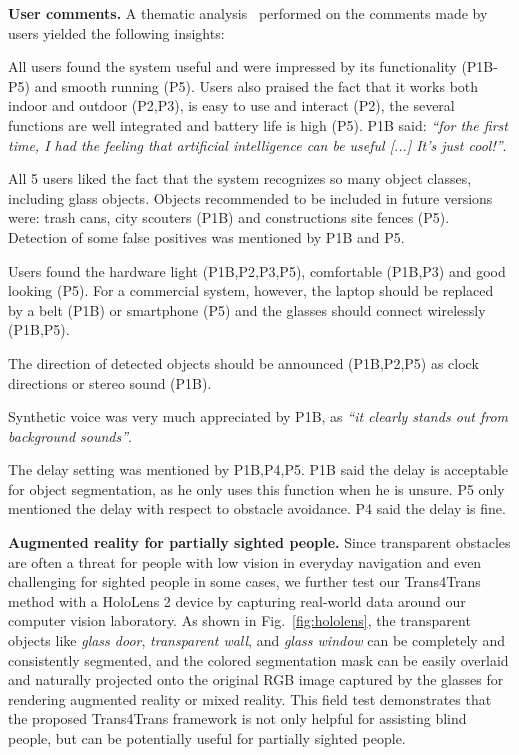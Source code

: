 \documentclass[10pt,twocolumn,letterpaper]{article}
\begin{document}
\noindent\textbf{User comments.}
A thematic analysis~\cite{Braun2006using} performed on the comments made by users yielded the following insights:
\begin{compactitem}
    \item All users found the system useful and were impressed by its functionality (P1B-P5) and smooth running (P5). Users also praised the fact that it works both indoor and outdoor (P2,P3), is easy to use and interact (P2), the several functions are well integrated and battery life is high (P5). P1B said: \emph{``for the first time, I had the feeling that artificial intelligence can be useful [...] It's just cool!''}.
    \item All 5 users liked the fact that the system recognizes so many object classes, including glass objects.
    Objects recommended to be included in future versions were: trash cans, city scouters (P1B) and constructions site fences (P5). Detection of some false positives was mentioned by P1B and P5.  
    \item Users found the hardware light (P1B,P2,P3,P5), comfortable (P1B,P3) and good looking (P5). For a commercial system, however, the laptop should be replaced by a belt (P1B) or smartphone (P5) and the glasses should connect wirelessly (P1B,P5).
    \item The direction of detected objects should be announced (P1B,P2,P5) as clock directions or stereo sound (P1B).
    \item Synthetic voice
    was very much appreciated by P1B, as \emph{``it clearly stands out from background sounds''}.
    \item The  delay setting was mentioned by P1B,P4,P5. P1B said the delay is acceptable for object segmentation, as he only uses this function when he is unsure.
    P5 only mentioned the delay with respect to obstacle avoidance. P4 said the delay is fine.
\end{compactitem}




\noindent\textbf{Augmented reality for partially sighted people.}
Since transparent obstacles are often a threat for people with low vision in everyday navigation and even challenging for sighted people in some cases, we further test our Trans4Trans method with a HoloLens 2 device by capturing real-world data around our computer vision laboratory. As shown in Fig.~\ref{fig:hololens}, the transparent objects like \emph{glass door}, \emph{transparent wall}, and \emph{glass window} can be completely and consistently segmented, and the colored segmentation mask can be easily overlaid and naturally projected onto the original RGB image captured by the glasses for rendering augmented reality or mixed reality. This field test demonstrates that the proposed Trans4Trans framework is not only helpful for assisting blind people, but can be potentially useful for partially sighted people. 
\end{document}

